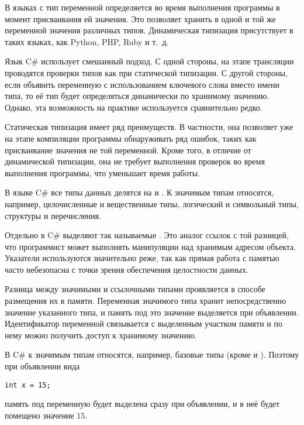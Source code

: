 В языках с  тип
переменной определяется во время выполнения программы в момент
присваивания ей значения. Это позволяет хранить в одной и той же
переменной значения различных типов.  Динамическая типизация
присутствует в таких языках, как Python, PHP, Ruby и т.~д.

Язык C\# использует смешанный подход. С одной стороны, на этапе
трансляции проводятся проверки типов как при статической типизации. С
другой стороны, если объявить переменную с использованием ключевого
слова  вместо имени типа, то её тип будет определяться
динамически по хранимому значению. Однако, эта возможность на практике
используется сравнительно редко.

Статическая типизация имеет ряд преимуществ. В частности, она
позволяет уже на этапе компиляции программы обнаруживать ряд ошибок,
таких как присваивание значения не той переменной. Кроме того, в
отличие от динамической типизации, она не требует выполнения проверок
во время выполнения программы, что уменьшает время работы.


В языке C\# все типы данных делятся на  и .
К значимым типам относятся, например, целочисленные и вещественные типы,
логический и символьный типы, структуры и перечисления.

Отдельно в C\# выделяют так называемые
. Это аналог ссылок с той разницей, что
программист может выполнять манипуляции над хранимым адресом
объекта. Указатели используются значительно реже, так как прямая
работа с памятью часто небезопасна с точки зрения обеспечения
целостности данных.

Разница между значимыми и ссылочными типами проявляется в способе
размещения их в памяти. Переменная значимого типа хранит
непосредственно значение указанного типа, и память под это значение
выделяется при объявлении. Идентификатор переменной связывается с
выделенным участком памяти и по нему можно получить доступ к хранимому
значению.

В C\# к значимым типам относятся, например, базовые типы (кроме
 и ). Поэтому при объявлении вида
\begin{lstlisting}
int x = 15;
\end{lstlisting}
память под переменную  будет выделена сразу при объявлении, и в
неё будет помещено значение $15.$

